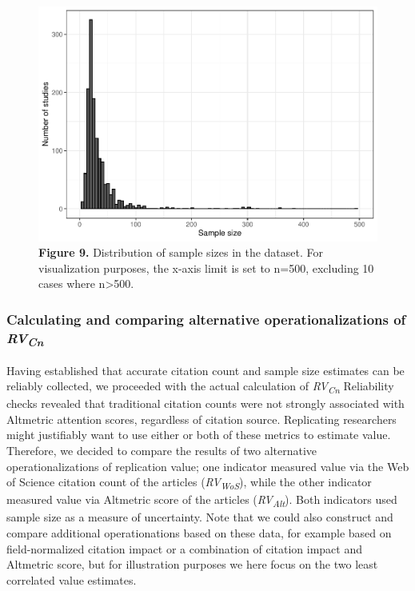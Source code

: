 \documentclass[
  man,floatsintext]{apa6}
\begin{document}
\begin{figure}
\centering
\includegraphics{RVcn_feasibility_in_social_neuroscience_files/figure-latex/fig9-1.pdf}
\caption{\label{fig:fig9}\textbf{Figure 9.} Distribution of sample sizes in the dataset. For visualization purposes, the x-axis limit is set to n=500, excluding 10 cases where n\textgreater500.}
\end{figure}

\hypertarget{calculating-and-comparing-alternative-operationalizations-of-rvcn}{%
\subsubsection{\texorpdfstring{Calculating and comparing alternative operationalizations of \emph{RV\textsubscript{Cn}}}{Calculating and comparing alternative operationalizations of RVCn}}\label{calculating-and-comparing-alternative-operationalizations-of-rvcn}}

Having established that accurate citation count and sample size estimates can be reliably collected, we proceeded with the actual calculation of \emph{RV\textsubscript{Cn}} Reliability checks revealed that traditional citation counts were not strongly associated with Altmetric attention scores, regardless of citation source. Replicating researchers might justifiably want to use either or both of these metrics to estimate value. Therefore, we decided to compare the results of two alternative operationalizations of replication value; one indicator measured value via the Web of Science citation count of the articles (\emph{RV\textsubscript{WoS}}), while the other indicator measured value via Altmetric score of the articles (\emph{RV\textsubscript{Alt}}). Both indicators used sample size as a measure of uncertainty. Note that we could also construct and compare additional operationations based on these data, for example based on field-normalized citation impact or a combination of citation impact and Altmetric score, but for illustration purposes we here focus on the two least correlated value estimates.
\end{document}
